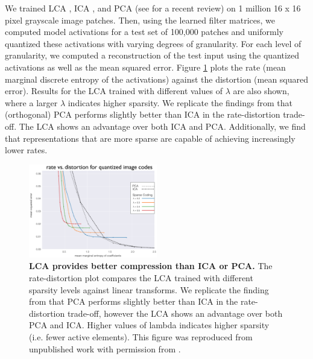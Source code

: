 We trained LCA \parencite{rozell2008sparse}, ICA \parencite{bell1997independent}, and PCA (see \cite{jolliffe2016principal} for a recent review) on 1 million 16 x 16 pixel grayscale image patches. Then, using the learned filter matrices, we computed model activations for a test set of 100,000 patches and uniformly quantized these activations with varying degrees of granularity. For each level of granularity, we computed a reconstruction of the test input using the quantized activations as well as the mean squared error. Figure \ref{fig:ch4_rate_distortion} plots the rate (mean marginal discrete entropy of the activations) against the distortion (mean squared error). Results for the LCA trained with different values of $\lambda$ are also shown, where a larger $\lambda$ indicates higher sparsity. We replicate the findings from \parencite{eichhorn2009natural} that (orthogonal) PCA  performs slightly better than ICA in the rate-distortion trade-off. The LCA shows an advantage over both ICA and PCA. Additionally, we find that representations that are more sparse are capable of achieving increasingly lower rates.

\begin{figure}[h]
    \centering
    \includegraphics[width=0.5\textwidth]{figures/rate_distortion.png}
    \caption{\textbf{LCA provides better compression than ICA or PCA.} The rate-distortion plot compares the LCA trained with different sparsity levels against linear transforms. We replicate the finding from \parencite{eichhorn2009natural} that PCA performs slightly better than ICA in the rate-distortion trade-off, however the LCA shows an advantage over both PCA and ICA. Higher values of lambda indicates higher sparsity (i.e. fewer active elements). This figure was reproduced from unpublished work with permission from \parencite{sanborn2016sampling}.}
    \label{fig:ch4_rate_distortion}
\end{figure}


